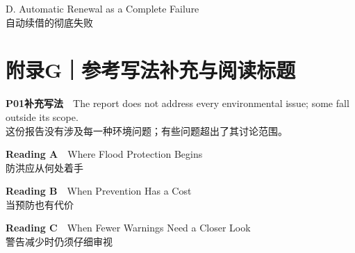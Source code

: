 \documentclass[a4paper,11pt,openany]{report}
\newcommand{\zhline}[1]{{\CJKsf\color{bodygrey}#1}}
\begin{document}
\begin{samepage}
D. Automatic Renewal as a Complete Failure\\
\zhline{自动续借的彻底失败}
\par\end{samepage}

\section{附录G｜参考写法补充与阅读标题}\label{ux9644ux5f55gux53c2ux8003ux5199ux6cd5ux8865ux5145ux4e0eux9605ux8bfbux6807ux9898}

\begin{samepage}
\textbf{P01补充写法}　The report does not address every environmental issue; some fall outside its scope.\\
\zhline{这份报告没有涉及每一种环境问题；有些问题超出了其讨论范围。}
\par\end{samepage}

\begin{samepage}
\textbf{Reading A}　Where Flood Protection Begins\\
\zhline{防洪应从何处着手}
\par\end{samepage}

\begin{samepage}
\textbf{Reading B}　When Prevention Has a Cost\\
\zhline{当预防也有代价}
\par\end{samepage}

\begin{samepage}
\textbf{Reading C}　When Fewer Warnings Need a Closer Look\\
\zhline{警告减少时仍须仔细审视}
\par\end{samepage}
\end{document}
